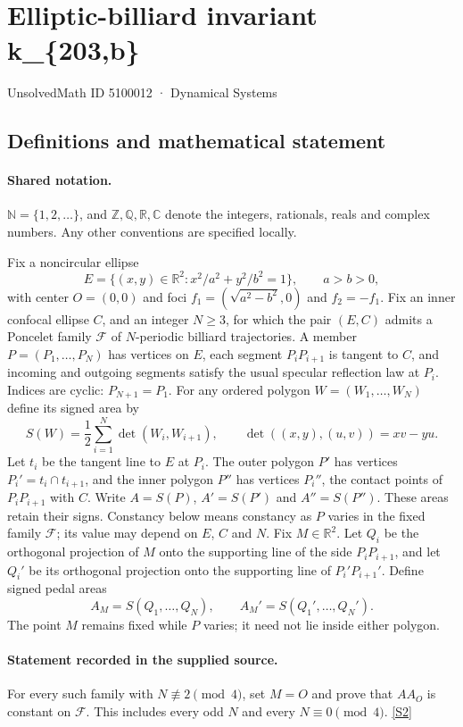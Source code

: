 \documentclass[11pt]{article}
\newcommand{\sref}[2]{\hyperlink{source:#1:#2}{[S#2]}}
\begin{document}
\setcounter{section}{5100011}
\section{Elliptic-billiard invariant k\_\{203,b\}}\label{5100012}
{\small\sffamily UnsolvedMath ID 5100012 · Dynamical Systems}
\subsection{Definitions and mathematical statement}

\paragraph{Shared notation.}$\mathbb N=\{1,2,\ldots\}$, and $\mathbb Z,\mathbb Q,\mathbb R,\mathbb C$ denote the integers, rationals, reals and complex numbers. Any other conventions are specified locally.


Fix a noncircular ellipse
\[
E=\{(x,y)\in\mathbb R^2:x^2/a^2+y^2/b^2=1\},\qquad a>b>0,
\]
with center $O=(0,0)$ and foci $f_1=(\sqrt{a^2-b^2},0)$ and $f_2=-f_1$. Fix an inner confocal ellipse $C$, and an integer $N\geq3$, for which the pair $(E,C)$ admits a Poncelet family $\mathcal F$ of $N$-periodic billiard trajectories. A member $P=(P_1,\ldots,P_N)$ has vertices on $E$, each segment $P_iP_{i+1}$ is tangent to $C$, and incoming and outgoing segments satisfy the usual specular reflection law at $P_i$. Indices are cyclic: $P_{N+1}=P_1$.
For any ordered polygon $W=(W_1,\ldots,W_N)$ define its signed area by
\[
S(W)=\frac12\sum_{i=1}^N\det(W_i,W_{i+1}),\qquad
\det((x,y),(u,v))=xv-yu.
\]
Let $t_i$ be the tangent line to $E$ at $P_i$. The outer polygon $P'$ has vertices $P_i'=t_i\cap t_{i+1}$, and the inner polygon $P''$ has vertices $P_i''$, the contact points of $P_iP_{i+1}$ with $C$. Write $A=S(P)$, $A'=S(P')$ and $A''=S(P'')$. These areas retain their signs. Constancy below means constancy as $P$ varies in the fixed family $\mathcal F$; its value may depend on $E$, $C$ and $N$.
Fix $M\in\mathbb R^2$. Let $Q_i$ be the orthogonal projection of $M$ onto the supporting line of the side $P_iP_{i+1}$, and let $Q_i'$ be its orthogonal projection onto the supporting line of $P_i'P_{i+1}'$. Define signed pedal areas
\[
A_M=S(Q_1,\ldots,Q_N),\qquad A_M'=S(Q_1',\ldots,Q_N').
\]
The point $M$ remains fixed while $P$ varies; it need not lie inside either polygon.
\paragraph{Statement recorded in the supplied source.}
For every such family with $N\not\equiv2\pmod4$, set $M=O$ and prove that $A A_O$ is constant on $\mathcal F$. This includes every odd $N$ and every $N\equiv0\pmod4$. \sref{5100012}{2}
\end{document}
